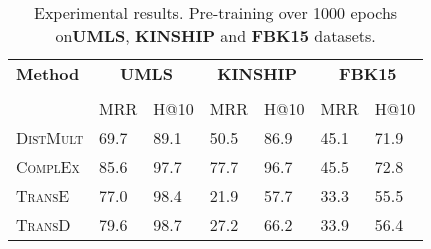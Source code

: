 \begin{table}[h]
    \centering
    \begin{tabular}{lllllll}
        \toprule
        \textbf{Method} &
        \multicolumn{2}{c}{\textbf{UMLS}} & 
        \multicolumn{2}{c}{\textbf{KINSHIP}} & 
        \multicolumn{2}{c}{\textbf{FBK15}}\\
        
        \cmidrule{2-6} \cmidrule{7-7} \\
        {} & MRR & H@10 & MRR & H@10 & MRR & H@10 \\
        
        \midrule

        \textsc{DistMult}  
        & 69.7 & 89.1 & 50.5 & 86.9 & 45.1 & 71.9\\
        
        \textsc{ComplEx}   
        & 85.6 & 97.7 & 77.7 & 96.7 & 45.5 & 72.8\\
        
        \textsc{TransE}    
        & 77.0 & 98.4 & 21.9 & 57.7 & 33.3 & 55.5 \\
        
        \textsc{TransD}    
        & 79.6 & 98.7 & 27.2 & 66.2 & 33.9 & 56.4 \\ 
        \bottomrule
    \end{tabular}
    \caption{Experimental results.
    Pre-training over 1000 epochs on\textbf{UMLS},
  \textbf{KINSHIP} and \textbf{FBK15} datasets.}
    \label{tab:result_table1_pretraining}
\end{table}



